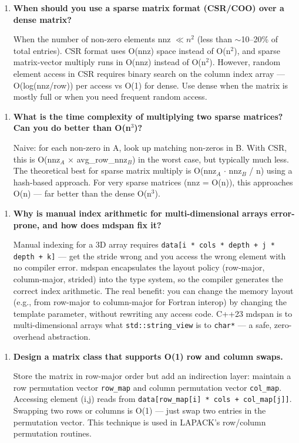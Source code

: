 \begin{enumerate}
\item \textbf{When should you use a sparse matrix format (CSR/COO) over a dense matrix?}

When the number of non-zero elements nnz $\ll n^{2}$ (less than $\sim$10--20\% of total entries). CSR format uses O(nnz) space instead of O(n$^{2}$), and sparse matrix-vector multiply runs in O(nnz) instead of O(n$^{2}$). However, random element access in CSR requires binary search on the column index array — O(log(nnz/row)) per access vs O(1) for dense. Use dense when the matrix is mostly full or when you need frequent random access.
\end{enumerate}

\begin{enumerate}
\item \textbf{What is the time complexity of multiplying two sparse matrices? Can you do better than O(n$^{3}$)?}

Naive: for each non-zero in A, look up matching non-zeros in B. With CSR, this is O(nnz$_{A}$ $\times$ avg\_row\_nnz$_{B}$) in the worst case, but typically much less. The theoretical best for sparse matrix multiply is O(nnz$_{A}$ $\cdot$ nnz$_{B}$ / n) using a hash-based approach. For very sparse matrices (nnz = O(n)), this approaches O(n) — far better than the dense O(n$^{3}$).
\end{enumerate}

\begin{enumerate}
\item \textbf{Why is manual index arithmetic for multi-dimensional arrays error-prone, and how does mdspan fix it?}

Manual indexing for a 3D array requires \texttt{data[i * cols * depth + j * depth + k]} — get the stride wrong and you access the wrong element with no compiler error. mdspan encapsulates the layout policy (row-major, column-major, strided) into the type system, so the compiler generates the correct index arithmetic. The real benefit: you can change the memory layout (e.g., from row-major to column-major for Fortran interop) by changing the template parameter, without rewriting any access code. C++23 mdspan is to multi-dimensional arrays what \texttt{std::string\_view} is to \texttt{char*} — a safe, zero-overhead abstraction.
\end{enumerate}

\begin{enumerate}
\item \textbf{Design a matrix class that supports O(1) row and column swaps.}

Store the matrix in row-major order but add an indirection layer: maintain a row permutation vector \texttt{row\_map} and column permutation vector \texttt{col\_map}. Accessing element (i,j) reads from \texttt{data[row\_map[i] * cols + col\_map[j]]}. Swapping two rows or columns is O(1) — just swap two entries in the permutation vector. This technique is used in LAPACK's row/column permutation routines.
\end{enumerate}

